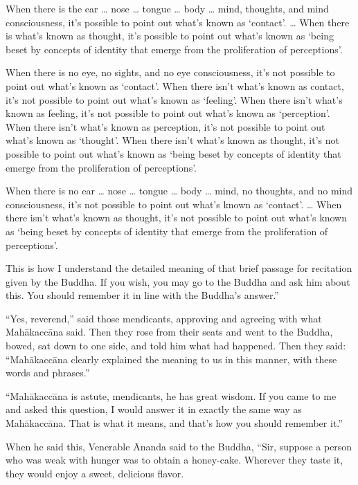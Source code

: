 \documentclass[12pt,openany]{book}%
\begin{document}
When there is the ear … nose … tongue … body … mind, thoughts, and mind consciousness, it’s possible to point out what’s known as ‘contact’. … When there is what’s known as thought, it’s possible to point out what’s known as ‘being beset by concepts of identity that emerge from the proliferation of perceptions’. 

When there is no eye, no sights, and no eye consciousness, it’s not possible to point out what’s known as ‘contact’. When there isn’t what’s known as contact, it’s not possible to point out what’s known as ‘feeling’. When there isn’t what’s known as feeling, it’s not possible to point out what’s known as ‘perception’. When there isn’t what’s known as perception, it’s not possible to point out what’s known as ‘thought’. When there isn’t what’s known as thought, it’s not possible to point out what’s known as ‘being beset by concepts of identity that emerge from the proliferation of perceptions’. 

When there is no ear … nose … tongue … body … mind, no thoughts, and no mind consciousness, it’s not possible to point out what’s known as ‘contact’. … When there isn’t what’s known as thought, it’s not possible to point out what’s known as ‘being beset by concepts of identity that emerge from the proliferation of perceptions’. 

This is how I understand the detailed meaning of that brief passage for recitation given by the Buddha. If you wish, you may go to the Buddha and ask him about this. You should remember it in line with the Buddha’s answer.” 

“Yes, reverend,” said those mendicants, approving and agreeing with what \textsanskrit{Mahākaccāna} said. Then they rose from their seats and went to the Buddha, bowed, sat down to one side, and told him what had happened. Then they said: “\textsanskrit{Mahākaccāna} clearly explained the meaning to us in this manner, with these words and phrases.” 

“\textsanskrit{Mahākaccāna} is astute, mendicants, he has great wisdom. If you came to me and asked this question, I would answer it in exactly the same way as \textsanskrit{Mahākaccāna}. That is what it means, and that’s how you should remember it.” 

When he said this, Venerable Ānanda said to the Buddha, “Sir, suppose a person who was weak with hunger was to obtain a honey-cake. Wherever they taste it, they would enjoy a sweet, delicious flavor. 
\end{document}
